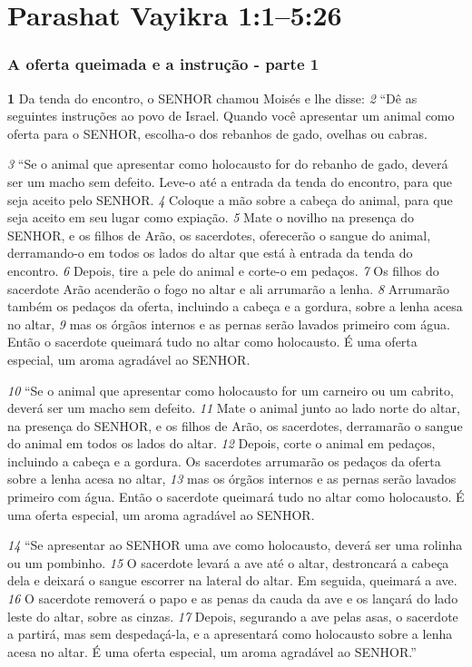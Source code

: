 \section*{Parashat Vayikra 1:1–5:26}    

\bigskip
\subsubsection*{A oferta queimada e a instrução - parte 1}
\textbf{\large 1} Da tenda do encontro, o SENHOR chamou Moisés e lhe disse: 
\textit{\tiny 2} 
“Dê as seguintes
instruções ao povo de Israel. Quando você apresentar um animal como oferta
para o SENHOR, escolha-o dos rebanhos de gado, ovelhas ou cabras. 

\smallskip
\textit{\tiny 3} 
“Se o animal que apresentar como holocausto for do rebanho de gado, deverá
ser um macho sem defeito. Leve-o até a entrada da tenda do encontro, para que
seja aceito pelo SENHOR. 
\textit{\tiny 4} 
Coloque a mão sobre a cabeça do animal, para que seja
aceito em seu lugar como expiação. 
\textit{\tiny 5} 
Mate o novilho na presença do SENHOR, e os
filhos de Arão, os sacerdotes, oferecerão o sangue do animal, derramando-o em
todos os lados do altar que está à entrada da tenda do encontro. 
\textit{\tiny 6} 
Depois, tire a
pele do animal e corte-o em pedaços. 
\textit{\tiny 7} 
Os filhos do sacerdote Arão acenderão o
fogo no altar e ali arrumarão a lenha. 
\textit{\tiny 8} 
Arrumarão também os pedaços da oferta,
incluindo a cabeça e a gordura, sobre a lenha acesa no altar, 
\textit{\tiny 9} 
mas os órgãos
internos e as pernas serão lavados primeiro com água. Então o sacerdote
queimará tudo no altar como holocausto. É uma oferta especial, um aroma
agradável ao SENHOR.
   
\smallskip
\textit{\tiny 10}
“Se o animal que apresentar como holocausto for um carneiro ou um cabrito,
deverá ser um macho sem defeito. 
\textit{\tiny 11}
Mate o animal junto ao lado norte do altar,
na presença do SENHOR, e os filhos de Arão, os sacerdotes, derramarão o sangue do
animal em todos os lados do altar. 
\textit{\tiny 12}
Depois, corte o animal em pedaços, incluindo
a cabeça e a gordura. Os sacerdotes arrumarão os pedaços da oferta sobre a lenha
acesa no altar, 
\textit{\tiny 13}
mas os órgãos internos e as pernas serão lavados primeiro com
água. Então o sacerdote queimará tudo no altar como holocausto. É uma oferta
especial, um aroma agradável ao SENHOR.

\smallskip
\textit{\tiny 14}
“Se apresentar ao SENHOR uma ave como holocausto, deverá ser uma rolinha
ou um pombinho. 
\textit{\tiny 15}
O sacerdote levará a ave até o altar, destroncará a cabeça dela
e deixará o sangue escorrer na lateral do altar. Em seguida, queimará a ave. 
\textit{\tiny 16}
O
sacerdote removerá o papo e as penas da cauda da ave e os lançará do lado leste
do altar, sobre as cinzas. 
\textit{\tiny 17}
Depois, segurando a ave pelas asas, o sacerdote a
partirá, mas sem despedaçá-la, e a apresentará como holocausto sobre a lenha
acesa no altar. É uma oferta especial, um aroma agradável ao SENHOR.”
   
